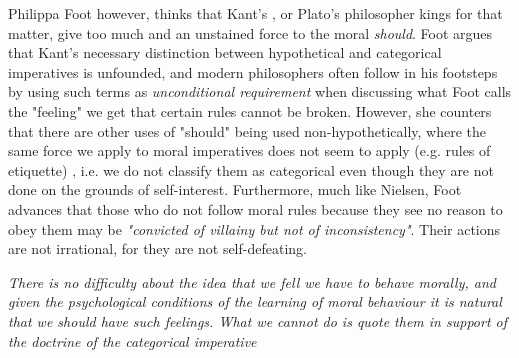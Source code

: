 \documentclass[english,course]{Notes}
\newcommand{\ita}[1]{\textit{#1}}
\newcommand\quo[1]{\begin{displayquote}\ita{\large{#1}}\end{displayquote}}
\begin{document}
\par{Philippa Foot however, thinks that Kant's , or Plato's philosopher kings for that matter, give too much and an unstained force to the moral \ita{should}. Foot argues that Kant's necessary distinction between hypothetical and categorical imperatives is unfounded, and modern philosophers often follow in his footsteps by using such terms as \ita{unconditional requirement} when discussing what Foot calls the "feeling" we get that certain rules cannot be broken. However, she counters that there are other uses of "should" being used non-hypothetically, where the same force we apply to moral imperatives does not seem to apply (e.g. rules of etiquette) , i.e. we do not classify them as categorical even though they are not done on the grounds of self-interest. Furthermore, much like Nielsen, Foot advances that those who do not follow moral rules because they see no reason to obey them may be \ita{"convicted of villainy but not of inconsistency"}. Their actions are not irrational, for they are not self-defeating.}

\quo{There is no difficulty about the idea that we fell we have to behave morally, and given the psychological conditions of the learning of moral behaviour it is natural that we should have such feelings. What we cannot do is quote them in support of the doctrine of the categorical imperative}
\end{document}

